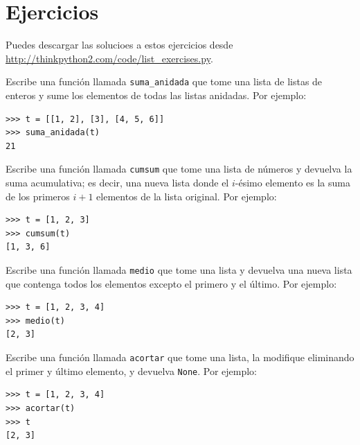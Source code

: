 \documentclass[10pt]{book}
\begin{document}
\section{Ejercicios}

Puedes descargar las solucioes a estos ejercicios desde
\url{http://thinkpython2.com/code/list_exercises.py}.

\begin{exercise}

Escribe una función llamada \verb"suma_anidada" que tome una lista de listas
de enteros y sume los elementos de todas las listas anidadas.
Por ejemplo:

\begin{verbatim}
>>> t = [[1, 2], [3], [4, 5, 6]]
>>> suma_anidada(t)
21
\end{verbatim}

\end{exercise}

\begin{exercise}
\label{cumulative}

Escribe una función llamada {\tt cumsum} que tome una lista de números y
devuelva la suma acumulativa; es decir, una nueva lista donde el $i$-ésimo
elemento es la suma de los primeros $i+1$ elementos de la lista original.
Por ejemplo:

\begin{verbatim}
>>> t = [1, 2, 3]
>>> cumsum(t)
[1, 3, 6]
\end{verbatim}

\end{exercise}

\begin{exercise}

Escribe una función llamada \verb"medio" que tome una lista y
devuelva una nueva lista que contenga todos los elementos excepto el primero
y el último.  Por ejemplo:

\begin{verbatim}
>>> t = [1, 2, 3, 4]
>>> medio(t)
[2, 3]
\end{verbatim}

\end{exercise}

\begin{exercise}

Escribe una función llamada \verb"acortar" que tome una lista, la modifique
eliminando el primer y último elemento, y devuelva {\tt None}.
Por ejemplo:

\begin{verbatim}
>>> t = [1, 2, 3, 4]
>>> acortar(t)
>>> t
[2, 3]
\end{verbatim}

\end{exercise}
\end{document}
